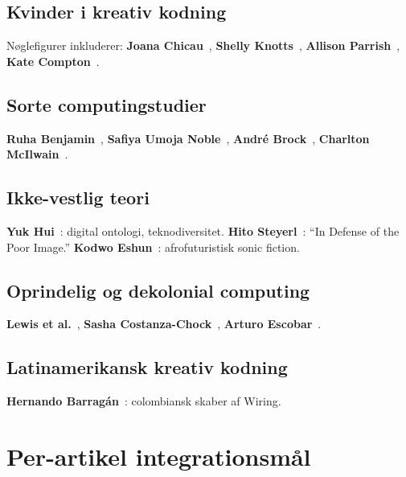 \documentclass[10pt,letterpaper,twocolumn]{article}
\begin{document}
\subsection{Kvinder i kreativ kodning}

Nøglefigurer inkluderer: \textbf{Joana Chicau}~\citep{chicau2021choreo}, \textbf{Shelly Knotts}~\citep{knotts2015algorithmic}, \textbf{Allison Parrish}~\citep{parrish2015programming}, \textbf{Kate Compton}~\citep{compton2015tracery}.

\subsection{Sorte computingstudier}

\textbf{Ruha Benjamin}~\citep{benjamin2019race}, \textbf{Safiya Umoja Noble}~\citep{noble2018algorithms}, \textbf{Andr\'e Brock}~\citep{brock2020distributed}, \textbf{Charlton McIlwain}~\citep{mcilwain2019black}.

\subsection{Ikke-vestlig teori}

\textbf{Yuk Hui}~\citep{hui2016existence, hui2019recursion}: digital ontologi, teknodiversitet. \textbf{Hito Steyerl}~\citep{steyerl2009poor}: ``In Defense of the Poor Image.'' \textbf{Kodwo Eshun}~\citep{eshun1998brilliant}: afrofuturistisk sonic fiction.

\subsection{Oprindelig og dekolonial computing}

\textbf{Lewis et al.}~\citep{lewis2018kin}, \textbf{Sasha Costanza-Chock}~\citep{costanza2020design}, \textbf{Arturo Escobar}~\citep{escobar2018designs}.

\subsection{Latinamerikansk kreativ kodning}

\textbf{Hernando Barrag\'an}~\citep{barragan2004wiring}: colombiansk skaber af Wiring.

\section{Per-artikel integrationsmål}
\end{document}
